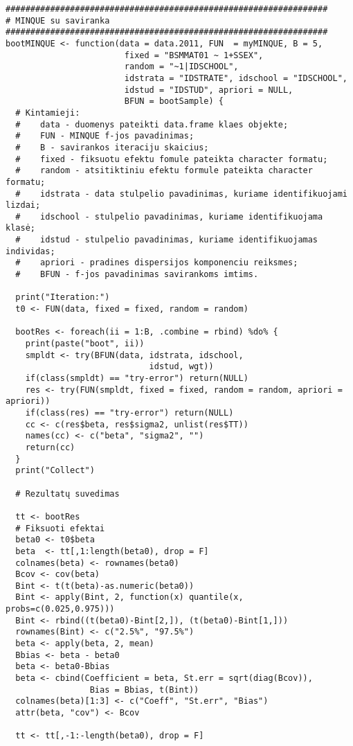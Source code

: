 \documentclass[12pt,a4paper]{article}
\begin{document}
\begin{appendix}
\begin{footnotesize}
\begin{verbatim}
#################################################################
# MINQUE su saviranka
#################################################################
bootMINQUE <- function(data = data.2011, FUN  = myMINQUE, B = 5,
                        fixed = "BSMMAT01 ~ 1+SSEX", 
                        random = "~1|IDSCHOOL",
                        idstrata = "IDSTRATE", idschool = "IDSCHOOL",
                        idstud = "IDSTUD", apriori = NULL,
                        BFUN = bootSample) {
  # Kintamieji:
  #    data - duomenys pateikti data.frame klaes objekte;
  #    FUN - MINQUE f-jos pavadinimas;
  #    B - savirankos iteraciju skaicius;
  #    fixed - fiksuotu efektu fomule pateikta character formatu;
  #    random - atsitiktiniu efektu formule pateikta character formatu;
  #    idstrata - data stulpelio pavadinimas, kuriame identifikuojami lizdai;
  #    idschool - stulpelio pavadinimas, kuriame identifikuojama klasė;
  #    idstud - stulpelio pavadinimas, kuriame identifikuojamas individas;
  #    apriori - pradines dispersijos komponenciu reiksmes;
  #    BFUN - f-jos pavadinimas savirankoms imtims.

  print("Iteration:")
  t0 <- FUN(data, fixed = fixed, random = random)
  
  bootRes <- foreach(ii = 1:B, .combine = rbind) %do% {
    print(paste("boot", ii))
    smpldt <- try(BFUN(data, idstrata, idschool,
                             idstud, wgt))
    if(class(smpldt) == "try-error") return(NULL)
    res <- try(FUN(smpldt, fixed = fixed, random = random, apriori = apriori))
    if(class(res) == "try-error") return(NULL)
    cc <- c(res$beta, res$sigma2, unlist(res$TT))
    names(cc) <- c("beta", "sigma2", "")
    return(cc)
  }
  print("Collect")
  
  # Rezultatų suvedimas

  tt <- bootRes
  # Fiksuoti efektai
  beta0 <- t0$beta
  beta  <- tt[,1:length(beta0), drop = F]
  colnames(beta) <- rownames(beta0)
  Bcov <- cov(beta)
  Bint <- t(t(beta)-as.numeric(beta0))
  Bint <- apply(Bint, 2, function(x) quantile(x, probs=c(0.025,0.975)))
  Bint <- rbind((t(beta0)-Bint[2,]), (t(beta0)-Bint[1,]))
  rownames(Bint) <- c("2.5%", "97.5%")
  beta <- apply(beta, 2, mean)
  Bbias <- beta - beta0
  beta <- beta0-Bbias
  beta <- cbind(Coefficient = beta, St.err = sqrt(diag(Bcov)), 
                 Bias = Bbias, t(Bint))
  colnames(beta)[1:3] <- c("Coeff", "St.err", "Bias")
  attr(beta, "cov") <- Bcov
  
  tt <- tt[,-1:-length(beta0), drop = F]
 

\end{verbatim}
\end{footnotesize}
\end{appendix}
\end{document}
